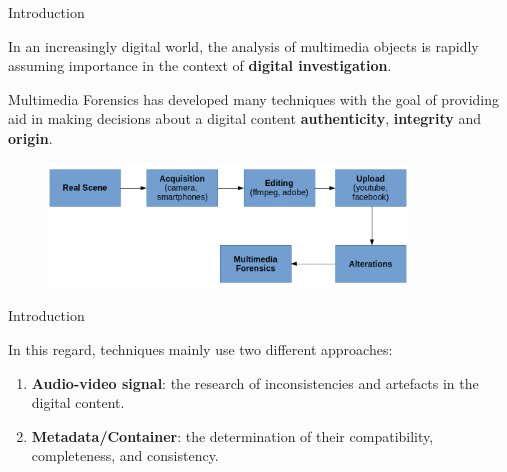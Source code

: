 \begin{tframe}{Introduction}

\vspace{0.2cm}

In an increasingly digital world, the analysis of multimedia objects is rapidly assuming importance in the context of \textbf{digital investigation}.

\vspace{0.5cm}

Multimedia Forensics has developed many techniques with the goal of providing aid in making decisions about a digital content \textbf{authenticity}, \textbf{integrity} and \textbf{origin}.

\begin{figure}
\centering
    \includegraphics[width=0.85\textwidth]{images/workflow.png}
\end{figure}

\end{tframe}

\begin{tframe}{Introduction}

\vspace{0.2cm}

In this regard, techniques mainly use two different approaches:

\begin{enumerate}
\item \textbf{Audio-video signal}: the research of inconsistencies and artefacts in the digital content.
\item \textbf{Metadata/Container}: the determination of their compatibility, completeness, and consistency.
\end{enumerate}

\end{tframe}

